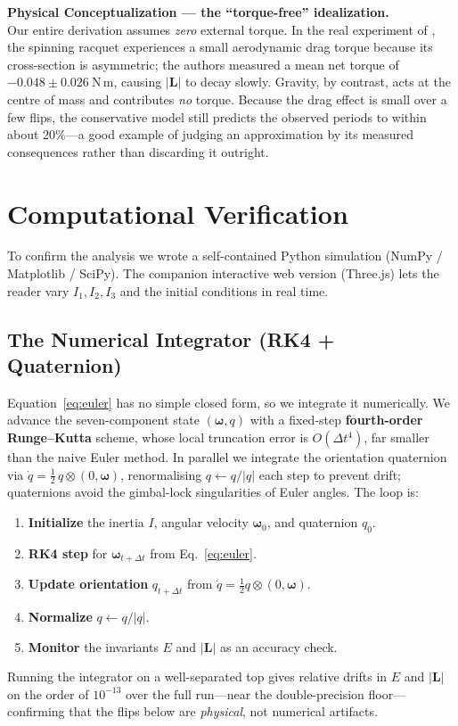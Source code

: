 \documentclass[11pt,letterpaper]{article}
\begin{document}
\begin{physicsinsight}
\textbf{Physical Conceptualization --- the ``torque-free'' idealization.} \\
Our entire derivation assumes \emph{zero} external torque. In the real
experiment of \cite{bubbar2025}, the spinning racquet experiences a small
aerodynamic drag torque because its cross-section is asymmetric; the authors
measured a mean net torque of $-0.048 \pm 0.026~\mathrm{N\,m}$, causing
$|\mathbf{L}|$ to decay slowly. Gravity, by contrast, acts at the centre of
mass and contributes \emph{no} torque. Because the drag effect is small over a
few flips, the conservative model still predicts the observed periods to within
about $20\%$---a good example of judging an approximation by its measured
consequences rather than discarding it outright.
\end{physicsinsight}

\section{Computational Verification}
\label{sec:verification}
To confirm the analysis we wrote a self-contained Python simulation (NumPy /
Matplotlib / SciPy). The companion interactive web version (Three.js) lets the
reader vary $I_1,I_2,I_3$ and the initial conditions in real time.

\subsection{The Numerical Integrator (RK4 + Quaternion)}
Equation~\eqref{eq:euler} has no simple closed form, so we integrate it
numerically. We advance the seven-component state
$(\boldsymbol{\omega}, q)$ with a fixed-step \textbf{fourth-order
Runge--Kutta} scheme, whose local truncation error is $O(\Delta t^4)$, far
smaller than the naive Euler method. In parallel we integrate the orientation
quaternion via $\dot q = \tfrac{1}{2}\, q \otimes (0, \boldsymbol{\omega})$,
renormalising $q \leftarrow q/|q|$ each step to prevent drift; quaternions
avoid the gimbal-lock singularities of Euler angles. The loop is:
\begin{enumerate}
\item \textbf{Initialize} the inertia $I$, angular velocity $\boldsymbol{\omega}_0$, and quaternion $q_0$.
\item \textbf{RK4 step} for $\boldsymbol{\omega}_{t+\Delta t}$ from Eq.~\eqref{eq:euler}.
\item \textbf{Update orientation} $q_{t+\Delta t}$ from $\dot q = \tfrac12 q\otimes(0,\boldsymbol{\omega})$.
\item \textbf{Normalize} $q \leftarrow q/|q|$.
\item \textbf{Monitor} the invariants $E$ and $|\mathbf{L}|$ as an accuracy check.
\end{enumerate}
Running the integrator on a well-separated top gives relative drifts in $E$ and
$|\mathbf{L}|$ on the order of $10^{-13}$ over the full run---near the
double-precision floor---confirming that the flips below are \emph{physical},
not numerical artifacts.
\end{document}
